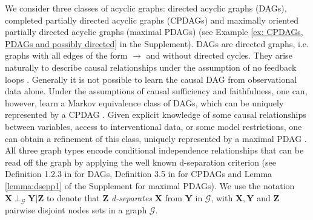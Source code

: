 \documentclass[11pt,a4paper]{article}
\theoremstyle{definition}
\theoremstyle{remark}
\newcommand{\mpdag}{maximal PDAG}
\newcommand{\g}[1][G]{\mathcal{#1}}
\begin{document}
We consider three classes of acyclic graphs: directed acyclic graphs (DAGs), completed partially directed acyclic graphs (CPDAGs) and maximally oriented partially directed acyclic graphs (maximal PDAGs) (see Example \ref{ex: CPDAGs, PDAGs and possibly directed} in the Supplement). DAGs are directed graphs, i.e. graphs with all edges of the form $\rightarrow$ and without directed cycles. They arise naturally to describe causal relationships under the assumption of no feedback loops \citep[cf.][]{pearl2009causality}. Generally it is not possible to learn the causal DAG from observational data alone. Under the assumptions of causal sufficiency and faithfulness, one can, however, learn a Markov equivalence class of DAGs, which can be uniquely represented by a CPDAG \citep{meek1995causal,andersson1997characterization,spirtes2000causation, Chickering02}. Given explicit knowledge of some causal relationships between variables, access to interventional data, or some model restrictions, one can obtain a refinement of this class, uniquely represented by a \mpdag{} \citep{meek1995causal,tetrad1998,hoyer08,hauserBuehlmann12,eigenmann17,wang2017permutation}. 
All three graph types encode conditional independence relationships that can be read off the graph by applying the well known d-separation criterion (see Definition 1.2.3 in \cite{pearl2009causality} for DAGs, Definition 3.5 in \cite{maathuis2013generalized} for CPDAGs and Lemma \ref{lemma:dsepp1} of the Supplement for \mpdag{}s). We use the notation $\mathbf{X} \perp_{\g} \mathbf{Y}|\mathbf{Z}$ to denote that $\mathbf{Z}$  \textit{d-separates} $\mathbf{X}$ from $\mathbf{Y}$ in $\g$, with $\mathbf{X},\mathbf{Y}$ and $\mathbf{Z}$ pairwise disjoint nodes sets in a graph $\g$. 






\end{document}
